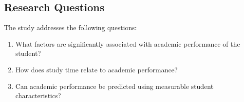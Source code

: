 \subsection{Research Questions}

The study addresses the following questions:

\begin{enumerate}
    \item What factors are significantly associated with academic performance of the student?
    \item How does study time relate to academic performance?
    \item Can academic performance be predicted using measurable student characteristics?
\end{enumerate}


 